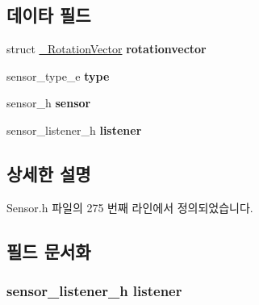 \subsection*{데이타 필드}
\begin{DoxyCompactItemize}
\item 
\hypertarget{struct___rotation_vector_extend_a273e40af4ef4690cbb95f7f77b6ef54e}{struct \hyperlink{struct___rotation_vector}{\-\_\-\-Rotation\-Vector} {\bfseries rotationvector}}\label{struct___rotation_vector_extend_a273e40af4ef4690cbb95f7f77b6ef54e}

\item 
\hypertarget{struct___rotation_vector_extend_abffb09766da2fc510a79bb51f82a36e1}{sensor\-\_\-type\-\_\-e {\bfseries type}}\label{struct___rotation_vector_extend_abffb09766da2fc510a79bb51f82a36e1}

\item 
\hypertarget{struct___rotation_vector_extend_a5bae9b7801bc3808411925cde81d3f26}{sensor\-\_\-h {\bfseries sensor}}\label{struct___rotation_vector_extend_a5bae9b7801bc3808411925cde81d3f26}

\item 
\hypertarget{struct___rotation_vector_extend_aa977dfb866b24fd7d9a20a9a01b2fd1f}{sensor\-\_\-listener\-\_\-h {\bfseries listener}}\label{struct___rotation_vector_extend_aa977dfb866b24fd7d9a20a9a01b2fd1f}

\end{DoxyCompactItemize}


\subsection{상세한 설명}


Sensor.\-h 파일의 275 번째 라인에서 정의되었습니다.



\subsection{필드 문서화}
\hypertarget{struct___rotation_vector_extend_aa977dfb866b24fd7d9a20a9a01b2fd1f}{
\subsubsection[{listener}]{\setlength{\rightskip}{0pt plus 5cm}sensor\-\_\-listener\-\_\-h listener}}\label{struct___rotation_vector_extend_aa977dfb866b24fd7d9a20a9a01b2fd1f}


